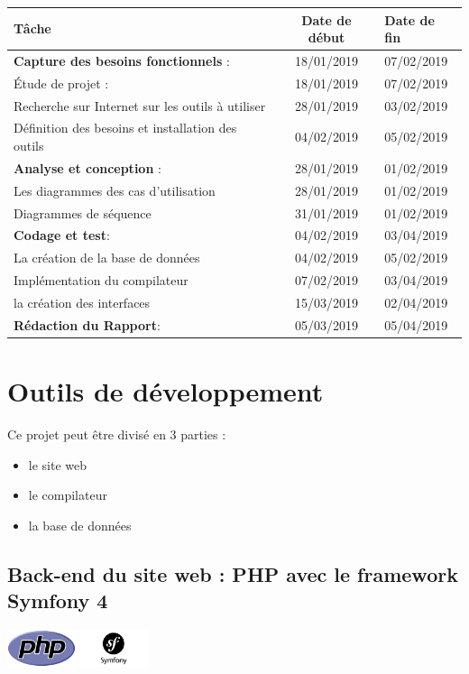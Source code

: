 \documentclass[12pt,a4paper]{article}
\begin{document}
\begin{tabularx}{\textwidth}{|l|c|X|}
  \hline
  \textbf{Tâche } & 
  \textbf{Date de début} & 
  \textbf{Date de fin} \\
  \hline
  \textbf{Capture des besoins fonctionnels} :& 18/01/2019 & 07/02/2019
  \\ 
     \hline
 
 Étude de projet : & 18/01/2019 &  07/02/2019
    \\
  \hline
 Recherche sur Internet sur les outils à utiliser  & 28/01/2019 &  03/02/2019
    \\
  \hline
 Définition des besoins et installation des outils  & 04/02/2019 &  05/02/2019
    \\
  \hline
  \textbf{Analyse et conception} :& 28/01/2019 & 01/02/2019
  \\ 
   \hline
  Les diagrammes des cas d'utilisation & 28/01/2019 &  01/02/2019 
    \\
  \hline
  Diagrammes de séquence & 31/01/2019 &  01/02/2019
    \\
    \hline
\textbf{Codage et test}: & 04/02/2019 &  03/04/2019
    \\
      \hline
La création de la base de données & 04/02/2019 &  05/02/2019
    \\
     \hline
Implémentation du compilateur & 07/02/2019 &  03/04/2019
    \\
         \hline
la création des interfaces & 15/03/2019 &  02/04/2019
    \\
       \hline
       

\textbf{Rédaction du Rapport}: & 05/03/2019 &  05/04/2019
  \\
  \hline

\end{tabularx}

\section{Outils de développement}

Ce projet peut être divisé en 3 parties :
\begin{itemize}  
  \item le site web
  \item le compilateur 
  \item la base de données
\end{itemize}

\subsection{Back-end du site web : PHP avec le framework Symfony 4}
\begin{center}
  \includegraphics[width=2cm]{img/php.png}
  \includegraphics[width=2cm]{img/symfony.png}
\end{center}
\end{document}
